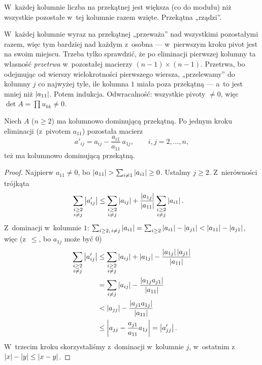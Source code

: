 \documentclass[11pt]{article}
\begin{document}
\begin{poludzku}
W~każdej kolumnie liczba na przekątnej jest większa (co do modułu) niż
wszystkie pozostałe w~tej kolumnie razem wzięte. Przekątna „rządzi”.
\end{poludzku}

\begin{intuicja}
W~każdej kolumnie wyraz na przekątnej „przeważa” nad wszystkimi
pozostałymi razem, więc tym bardziej nad każdym z~osobna --- w~pierwszym
kroku pivot jest na swoim miejscu. Trzeba tylko sprawdzić, że po
eliminacji pierwszej kolumny ta własność \emph{przetrwa} w~pozostałej
macierzy $(n-1)\times(n-1)$. Przetrwa, bo odejmując od wierszy wielokrotności
pierwszego wiersza, „przelewamy” do kolumny $j$ co najwyżej tyle, ile
kolumna $1$ miała poza przekątną --- a~to jest mniej niż $\left\lvert a_{11} \right\rvert$.
Potem indukcja. Odwracalność: wszystkie pivoty $\neq0$, więc
$\det A=\prod u_{kk}\ne0$.
\end{intuicja}

\formalnie
\begin{lemat}\label{lem:dominacja}
Niech $A$ ($n\ge2$) ma kolumnowo dominującą przekątną. Po jednym kroku
eliminacji (z~pivotem $a_{11}$) pozostała macierz
\[
a'_{ij}=a_{ij}-\frac{a_{i1}}{a_{11}}\,a_{1j},\qquad i,j=2,\ldots,n,
\]
też ma kolumnowo dominującą przekątną.
\end{lemat}

\begin{proof}
Najpierw $a_{11}\ne0$, bo $\left\lvert a_{11} \right\rvert>\sum_{i\ne1}\left\lvert a_{i1} \right\rvert\ge0$.
Ustalmy $j\ge2$. Z~nierówności trójkąta
\begin{align*}
\sum_{\substack{i\ge2\\i\ne j}}\left\lvert a'_{ij} \right\rvert
&\le\sum_{\substack{i\ge2\\i\ne j}}\left\lvert a_{ij} \right\rvert
+\frac{\left\lvert a_{1j} \right\rvert}{\left\lvert a_{11} \right\rvert}\sum_{\substack{i\ge2\\i\ne j}}\left\lvert a_{i1} \right\rvert.
\end{align*}
Z~dominacji w~kolumnie $1$:
$\sum_{i\ge2,\,i\ne j}\left\lvert a_{i1} \right\rvert=\sum_{i\ge2}\left\lvert a_{i1} \right\rvert-\left\lvert a_{j1} \right\rvert
<\left\lvert a_{11} \right\rvert-\left\lvert a_{j1} \right\rvert$, więc (z~$\le$, bo $a_{1j}$ może być $0$)
\begin{align*}
\sum_{\substack{i\ge2\\i\ne j}}\left\lvert a'_{ij} \right\rvert
&\le\sum_{\substack{i\ge2\\i\ne j}}\left\lvert a_{ij} \right\rvert+\left\lvert a_{1j} \right\rvert
-\frac{\left\lvert a_{1j} \right\rvert\left\lvert a_{j1} \right\rvert}{\left\lvert a_{11} \right\rvert}\\
&=\sum_{i\ne j}\left\lvert a_{ij} \right\rvert-\frac{\left\lvert a_{1j}a_{j1} \right\rvert}{\left\lvert a_{11} \right\rvert}\\
&<\left\lvert a_{jj} \right\rvert-\frac{\left\lvert a_{j1}a_{1j} \right\rvert}{\left\lvert a_{11} \right\rvert}\\
&\le\left\lvert a_{jj}-\frac{a_{j1}}{a_{11}}a_{1j} \right\rvert=\left\lvert a'_{jj} \right\rvert.
\end{align*}
W~trzecim kroku skorzystaliśmy z~dominacji w~kolumnie $j$, w~ostatnim
z~$\left\lvert x \right\rvert-\left\lvert y \right\rvert\le\left\lvert x-y \right\rvert$.
\end{proof}
\end{document}
